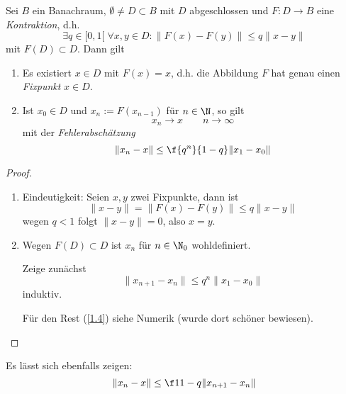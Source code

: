 \begin{st} \label{1.3}
	Sei $B$ ein Banachraum, $\emptyset \neq D \subset B$ mit $D$ abgeschlossen und $F: D \to B$ eine \emph{Kontraktion}, d.h.
	\[
		\exists q \in [0,1[ \; \forall x,y \in D : \|F(x) - F(y)\| \le q\|x-y\|
	\]
	mit $F(D) \subset D$. Dann gilt
	\begin{enumerate}[1)]
		\item
			Es existiert $x\in D$ mit $F(x)=x$, d.h. die Abbildung $F$ hat genau einen \emph{Fixpunkt} $x\in D$.
		\item
			Ist $x_0 \in D$ und $x_n := F(x_{n-1})$ für $n\in \N$, so gilt
			\[
				x_n \to x \qquad n \to \infty
			\]
			mit der \emph{Fehlerabschätzung}
			\[
				\|x_n - x\| \le \f{q^n}{1-q} \|x_1 - x_0\|
			\]
	\end{enumerate}
	\begin{proof}
		\begin{enumerate}[1)]
			\item
				Eindeutigkeit: Seien $x,y$ zwei Fixpunkte, dann ist
				\[
					\|x-y\| = \|F(x) - F(y)\| \le q \|x-y\|
				\]
				wegen $q < 1$ folgt $\|x-y\| = 0$, also $x=y$.
			\item
				Wegen $F(D) \subset D$ ist $x_n$ für $n\in \N_0$ wohldefiniert.

				Zeige zunächst
				\[
					\|x_{n+1} - x_n\| \le q^n \|x_1 - x_0\|
				\]
				induktiv.

				Für den Rest (\ref{1.4}) siehe Numerik (wurde dort schöner bewiesen).
		\end{enumerate}
	\end{proof}
\end{st}

\begin{nt} \label{1.4}
	Es lässt sich ebenfalls zeigen:
	\[
		\|x_n - x\| \le \f 1{1-q} \|x_{n+1} -x_n \|
	\]
\end{nt}

